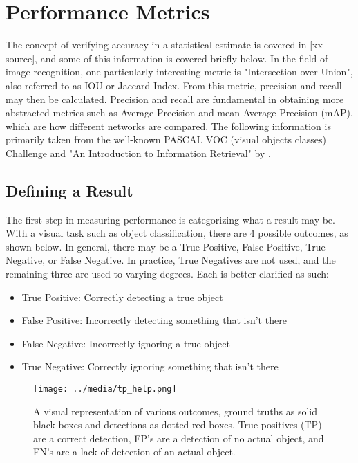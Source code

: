 

\section{Performance Metrics}
The concept of verifying accuracy in a statistical estimate is covered in [xx source], and some of this information is covered briefly below. In the field of image recognition, one particularly interesting metric is "Intersection over Union", also referred to as IOU or Jaccard Index. From this metric, precision and recall may then be calculated. Precision and recall are fundamental in obtaining more abstracted metrics such as Average Precision and mean Average Precision (mAP), which are how different networks are compared. The following information is primarily taken from the well-known PASCAL VOC (visual objects classes) Challenge \cite{everingham_pascal_2010} and "An Introduction to Information Retrieval" by \cite{manning_introduction_2008}.

\subsection{Defining a Result}
The first step in measuring performance is categorizing what a result may be. With a visual task such as object classification, there are 4 possible outcomes, as shown below. In general, there may be a True Positive, False Positive, True Negative, or False Negative. In practice, True Negatives are not used, and the remaining three are used to varying degrees. Each is better clarified as such:
\begin{itemize} \itemsep=-.5em
	\item True Positive: Correctly detecting a true object
	\item False Positive: Incorrectly detecting something that isn't there
	\item False Negative: Incorrectly ignoring a true object
	\item True Negative: Correctly ignoring something that isn't there
\end{itemize}

\begin{figure}[h] %
	\centering
	\texttt{[image: ../media/tp\_help.png]}
	\caption{A visual representation of various outcomes, ground truths as solid black boxes and detections as dotted red boxes. True positives (TP) are a correct detection, FP's are a detection of no actual object, and FN's are a lack of detection of an actual object.}
	\label{tp_help} %
\end{figure}

